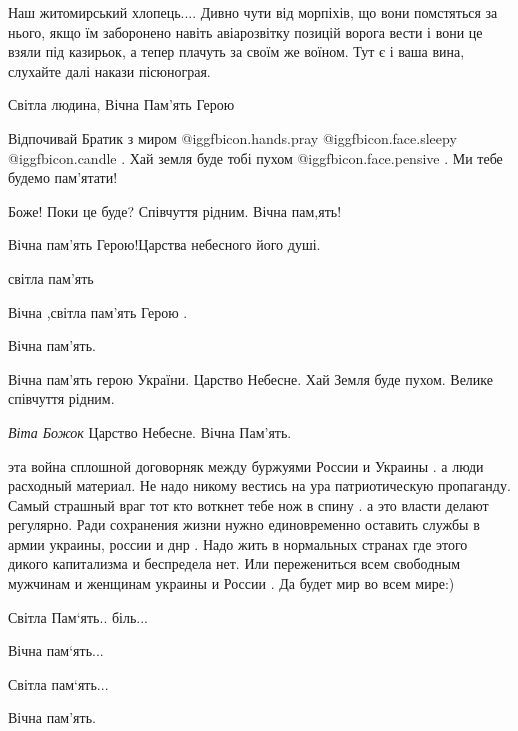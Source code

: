 \begin{itemize}

Наш житомирський хлопець.... Дивно чути від морпіхів, що вони помстяться за
нього, якщо їм заборонено навіть авіарозвітку позицій ворога вести і вони це
взяли під казирьок, а тепер плачуть за своїм же воїном. Тут є і ваша вина,
слухайте далі накази пісюнограя.


Світла людина, Вічна Пам'ять Герою


Відпочивай Братик з миром @igg{fbicon.hands.pray}  @igg{fbicon.face.sleepy}  @igg{fbicon.candle} . Хай
земля буде тобі пухом @igg{fbicon.face.pensive} . Ми тебе будемо пам'ятати!

Боже! Поки це буде? Співчуття рідним. Вічна пам,ять!

Вічна пам'ять Герою!Царства небесного його душі.

світла пам'ять

Вічна ,світла пам'ять Герою .

Вічна пам'ять.

Вічна пам'ять герою України. Царство Небесне. Хай Земля буде пухом. Велике співчуття рідним.

\emph{Віта Божок}
Царство Небесне. Вічна Пам'ять.


эта война сплошной договорняк между буржуями России и Украины . а люди
расходный материал. Не надо никому вестись на ура патриотическую пропаганду.
Самый страшный враг тот кто воткнет тебе нож в спину . а это власти делают
регулярно. Ради сохранения жизни нужно единовременно оставить службы в армии
украины, россии и днр . Надо жить в нормальных странах где этого дикого
капитализма и беспредела нет. Или пережениться всем свободным мужчинам и
женщинам украины и России . Да будет мир во всем мире:)


Світла Пам‘ять.. біль...

Вічна пам‘ять...

Світла пам‘ять...

Вічна пам'ять.


\end{itemize} %
